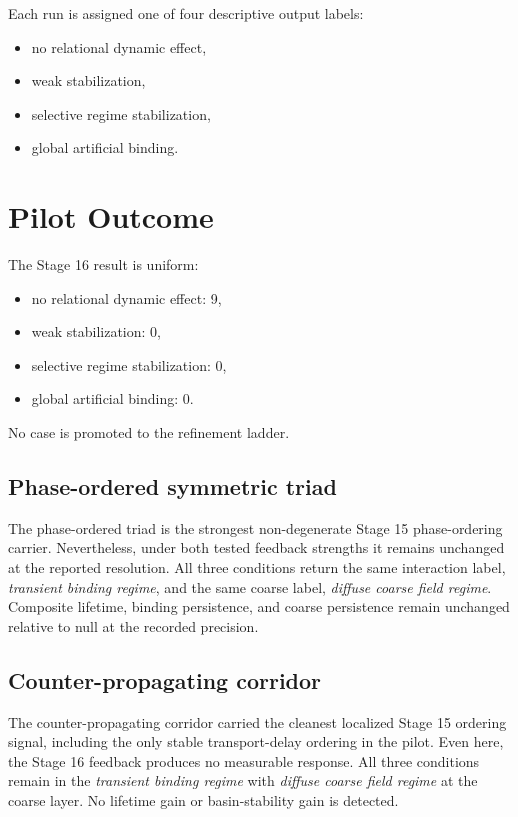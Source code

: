 \documentclass[11pt]{article}
\begin{document}
Each run is assigned one of four descriptive output labels:
\begin{itemize}
\item no relational dynamic effect,
\item weak stabilization,
\item selective regime stabilization,
\item global artificial binding.
\end{itemize}

\section{Pilot Outcome}

The Stage 16 result is uniform:
\begin{itemize}
\item no relational dynamic effect: 9,
\item weak stabilization: 0,
\item selective regime stabilization: 0,
\item global artificial binding: 0.
\end{itemize}

No case is promoted to the refinement ladder.

\subsection{Phase-ordered symmetric triad}

The phase-ordered triad is the strongest non-degenerate Stage 15 phase-ordering carrier. Nevertheless, under both tested feedback strengths it remains unchanged at the reported resolution. All three conditions return the same interaction label, \emph{transient binding regime}, and the same coarse label, \emph{diffuse coarse field regime}. Composite lifetime, binding persistence, and coarse persistence remain unchanged relative to null at the recorded precision.

\subsection{Counter-propagating corridor}

The counter-propagating corridor carried the cleanest localized Stage 15 ordering signal, including the only stable transport-delay ordering in the pilot. Even here, the Stage 16 feedback produces no measurable response. All three conditions remain in the \emph{transient binding regime} with \emph{diffuse coarse field regime} at the coarse layer. No lifetime gain or basin-stability gain is detected.
\end{document}
